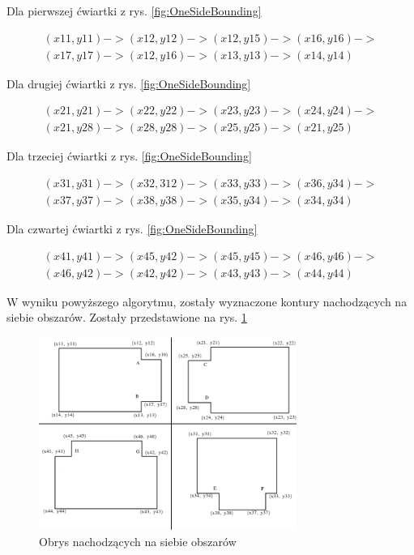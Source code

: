 Dla pierwszej ćwiartki z rys. \ref{fig:OneSideBounding}

\begin{equation}
\begin{split}
(x11, y11) -> (x12, y12) -> (x12, y15) -> (x16, y16) ->  \\
(x17, y17) -> (x12, y16) -> (x13, y13) -> (x14, y14)
\end{split}
\end{equation}

Dla drugiej ćwiartki z rys. \ref{fig:OneSideBounding}

\begin{equation}
\begin{split}
(x21, y21) -> (x22, y22) -> (x23, y23) -> (x24, y24) ->  \\
(x21, y28) -> (x28, y28) -> (x25, y25) -> (x21, y25)
\end{split}
\end{equation}

Dla trzeciej ćwiartki z rys. \ref{fig:OneSideBounding}

\begin{equation}
\begin{split}
(x31, y31) -> (x32, 312) -> (x33, y33) -> (x36, y34) ->  \\
(x37, y37) -> (x38, y38) -> (x35, y34) -> (x34, y34)
\end{split}
\end{equation}

Dla czwartej ćwiartki z rys. \ref{fig:OneSideBounding}

\begin{equation}
\begin{split}
(x41, y41) -> (x45, y42) -> (x45, y45) -> (x46, y46) ->  \\
(x46, y42) -> (x42, y42) -> (x43, y43) -> (x44, y44)
\end{split}
\end{equation}

W wyniku powyższego algorytmu, zostały wyznaczone kontury nachodzących na siebie obszarów. Zostały przedstawione na rys. \ref{fig:OneSideBoundingRemoved}

\begin{figure}[h]
\caption{Obrys nachodzących na siebie obszarów}
\label{fig:OneSideBoundingRemoved}
\centering
\includegraphics[width=0.75\textwidth]{OneSideBoundingRemoved}
\end{figure}

